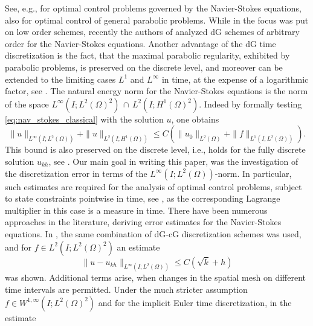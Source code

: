\documentclass{m2an}
\newcommand{\ukh}{u_{kh}}
\newcommand{\Linftwo}{L^\infty(I;L^2(\Omega)^2)}
\newcommand{\LtwoHoned}{L^2(I;H^1(\Omega)^2)}
\begin{document}
See, e.g., \cite{casas_discontinuous_2012,casas_analysis_2016}
for optimal control problems governed by the Navier-Stokes equations, 
also \cite{meidner_priori_2011,leykekhman_numerical_2020}
for optimal control of general parabolic problems.
While in \cite{casas_discontinuous_2012,casas_analysis_2016} the focus was put on low order schemes,
recently the authors of \cite{ahmed_higherorder_2021} analyzed dG schemes of arbitrary order for the 
Navier-Stokes equations.
Another advantage of the dG time discretization is the fact, that the maximal parabolic regularity,
exhibited by parabolic problems,
is preserved on the discrete level, and moreover can be extended to the limiting 
cases $L^1$ and $L^\infty$ in time, at the expense of a logarithmic factor,
see \cite[Theorems 11 \& 12]{leykekhman_discrete_2017}.
The natural energy norm for the Navier-Stokes equations is the norm of the space
$\Linftwo \, \cap \, \LtwoHoned$.
Indeed by formally testing \eqref{eq:nav_stokes_classical} with the solution $u$, one obtains
\begin{equation*}
  \|u\|_{L^\infty(I;L^2(\Omega))} + \|u\|_{L^2(I;H^1(\Omega))} 
  \le C\left(\|u_0\|_{L^2(\Omega)} + \|f\|_{L^1(I;L^2(\Omega))} \right).
\end{equation*}
This bound is also preserved on the discrete level, i.e., holds for the fully discrete solution $\ukh$,
see .
Our main goal in writing this paper, was the investigation of 
the discretization error in terms of the $L^\infty(I;L^2(\Omega))$-norm.
In particular, such estimates are required for the
analysis of optimal control problems, subject to state constraints pointwise in time,
see \cite{meidner_priori_2011}, as the corresponding Lagrange multiplier in this case is a measure in time.
There have been numerous approaches in the literature,
deriving error estimates for the Navier-Stokes equations.
In \cite[Theorem 4.7]{casas_discontinuous_2012},
the same combination of dG-cG discretization schemes was used,
and for $f \in L^2(I;L^2(\Omega)^2)$ an estimate
\begin{equation}\label{eq:errest_casas}
  \|u - \ukh\|_{L^\infty(I;L^2(\Omega))} \le C ( \sqrt{k} + h)
\end{equation}
was shown. 
Additional terms arise, when changes in the spatial mesh on different time intervals are permitted.
Under the much stricter assumption $f \in W^{1,\infty}(I;L^2(\Omega)^2)$ and for
the implicit Euler time discretization, in 
\cite{heywood_finite_1986} the estimate
\end{document}
